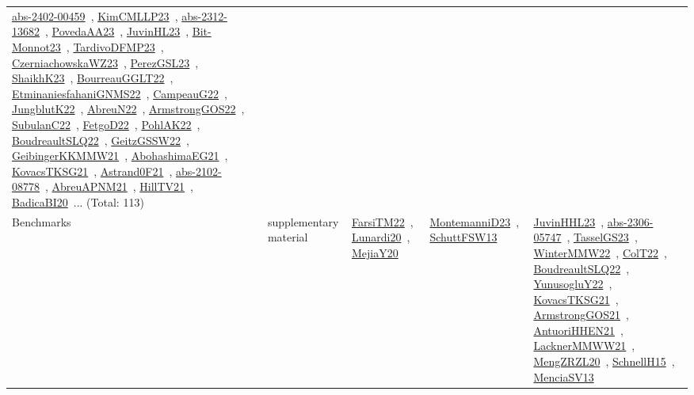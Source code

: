{\begin{longtable}{lp{3cm}>{\raggedright\arraybackslash}p{6cm}>{\raggedright\arraybackslash}p{6cm}>{\raggedright\arraybackslash}p{8cm}}
\href{works/abs-2402-00459.pdf}{abs-2402-00459}~\cite{abs-2402-00459}, \href{works/KimCMLLP23.pdf}{KimCMLLP23}~\cite{KimCMLLP23}, \href{works/abs-2312-13682.pdf}{abs-2312-13682}~\cite{abs-2312-13682}, \href{works/PovedaAA23.pdf}{PovedaAA23}~\cite{PovedaAA23}, \href{works/JuvinHL23.pdf}{JuvinHL23}~\cite{JuvinHL23}, \href{works/Bit-Monnot23.pdf}{Bit-Monnot23}~\cite{Bit-Monnot23}, \href{works/TardivoDFMP23.pdf}{TardivoDFMP23}~\cite{TardivoDFMP23}, \href{works/CzerniachowskaWZ23.pdf}{CzerniachowskaWZ23}~\cite{CzerniachowskaWZ23}, \href{works/PerezGSL23.pdf}{PerezGSL23}~\cite{PerezGSL23}, \href{works/ShaikhK23.pdf}{ShaikhK23}~\cite{ShaikhK23}, \href{works/BourreauGGLT22.pdf}{BourreauGGLT22}~\cite{BourreauGGLT22}, \href{works/EtminaniesfahaniGNMS22.pdf}{EtminaniesfahaniGNMS22}~\cite{EtminaniesfahaniGNMS22}, \href{works/CampeauG22.pdf}{CampeauG22}~\cite{CampeauG22}, \href{works/JungblutK22.pdf}{JungblutK22}~\cite{JungblutK22}, \href{works/AbreuN22.pdf}{AbreuN22}~\cite{AbreuN22}, \href{works/ArmstrongGOS22.pdf}{ArmstrongGOS22}~\cite{ArmstrongGOS22}, \href{works/SubulanC22.pdf}{SubulanC22}~\cite{SubulanC22}, \href{works/FetgoD22.pdf}{FetgoD22}~\cite{FetgoD22}, \href{works/PohlAK22.pdf}{PohlAK22}~\cite{PohlAK22}, \href{works/BoudreaultSLQ22.pdf}{BoudreaultSLQ22}~\cite{BoudreaultSLQ22}, \href{works/GeitzGSSW22.pdf}{GeitzGSSW22}~\cite{GeitzGSSW22}, \href{works/GeibingerKKMMW21.pdf}{GeibingerKKMMW21}~\cite{GeibingerKKMMW21}, \href{works/AbohashimaEG21.pdf}{AbohashimaEG21}~\cite{AbohashimaEG21}, \href{works/KovacsTKSG21.pdf}{KovacsTKSG21}~\cite{KovacsTKSG21}, \href{works/Astrand0F21.pdf}{Astrand0F21}~\cite{Astrand0F21}, \href{works/abs-2102-08778.pdf}{abs-2102-08778}~\cite{abs-2102-08778}, \href{works/AbreuAPNM21.pdf}{AbreuAPNM21}~\cite{AbreuAPNM21}, \href{works/HillTV21.pdf}{HillTV21}~\cite{HillTV21}, \href{works/BadicaBI20.pdf}{BadicaBI20}~\cite{BadicaBI20}... (Total: 113)\\
Benchmarks & supplementary material & \href{works/FarsiTM22.pdf}{FarsiTM22}~\cite{FarsiTM22}, \href{works/Lunardi20.pdf}{Lunardi20}~\cite{Lunardi20}, \href{works/MejiaY20.pdf}{MejiaY20}~\cite{MejiaY20} & \href{works/MontemanniD23.pdf}{MontemanniD23}~\cite{MontemanniD23}, \href{works/SchuttFSW13.pdf}{SchuttFSW13}~\cite{SchuttFSW13} & \href{works/JuvinHHL23.pdf}{JuvinHHL23}~\cite{JuvinHHL23}, \href{works/abs-2306-05747.pdf}{abs-2306-05747}~\cite{abs-2306-05747}, \href{works/TasselGS23.pdf}{TasselGS23}~\cite{TasselGS23}, \href{works/WinterMMW22.pdf}{WinterMMW22}~\cite{WinterMMW22}, \href{works/ColT22.pdf}{ColT22}~\cite{ColT22}, \href{works/BoudreaultSLQ22.pdf}{BoudreaultSLQ22}~\cite{BoudreaultSLQ22}, \href{works/YunusogluY22.pdf}{YunusogluY22}~\cite{YunusogluY22}, \href{works/KovacsTKSG21.pdf}{KovacsTKSG21}~\cite{KovacsTKSG21}, \href{works/ArmstrongGOS21.pdf}{ArmstrongGOS21}~\cite{ArmstrongGOS21}, \href{works/AntuoriHHEN21.pdf}{AntuoriHHEN21}~\cite{AntuoriHHEN21}, \href{works/LacknerMMWW21.pdf}{LacknerMMWW21}~\cite{LacknerMMWW21}, \href{works/MengZRZL20.pdf}{MengZRZL20}~\cite{MengZRZL20}, \href{works/SchnellH15.pdf}{SchnellH15}~\cite{SchnellH15}, \href{works/MenciaSV13.pdf}{MenciaSV13}~\cite{MenciaSV13}\\

\end{longtable}}
